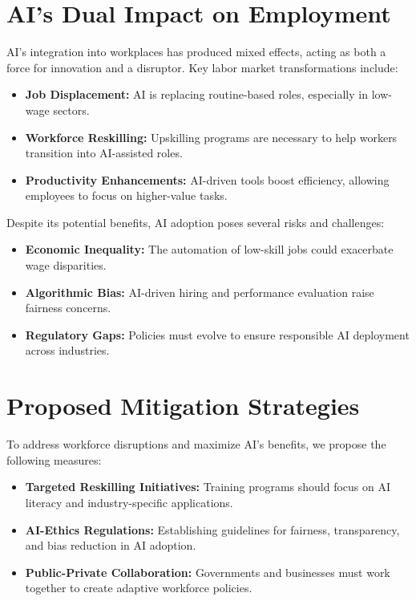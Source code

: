 \documentclass[a4paper,headinclude=on,footinclude=on,12pt,oneside]{scrbook}
\begin{document}
\section{AI’s Dual Impact on Employment}

AI’s integration into workplaces has produced mixed effects, acting as both a force for innovation and a disruptor. Key labor market transformations include:
\begin{itemize}
	\item \textbf{Job Displacement:} AI is replacing routine-based roles, especially in low-wage sectors.
	\item \textbf{Workforce Reskilling:} Upskilling programs are necessary to help workers transition into AI-assisted roles.
	\item \textbf{Productivity Enhancements:} AI-driven tools boost efficiency, allowing employees to focus on higher-value tasks.
\end{itemize}


Despite its potential benefits, AI adoption poses several risks and challenges:
\begin{itemize}
	\item \textbf{Economic Inequality:} The automation of low-skill jobs could exacerbate wage disparities.
	\item \textbf{Algorithmic Bias:} AI-driven hiring and performance evaluation raise fairness concerns.
	\item \textbf{Regulatory Gaps:} Policies must evolve to ensure responsible AI deployment across industries.
\end{itemize}

\section{Proposed Mitigation Strategies}

To address workforce disruptions and maximize AI’s benefits, we propose the following measures:
\begin{itemize}
	\item \textbf{Targeted Reskilling Initiatives:} Training programs should focus on AI literacy and industry-specific applications.
	\item \textbf{AI-Ethics Regulations:} Establishing guidelines for fairness, transparency, and bias reduction in AI adoption.
	\item \textbf{Public-Private Collaboration:} Governments and businesses must work together to create adaptive workforce policies.
\end{itemize}
\end{document}
